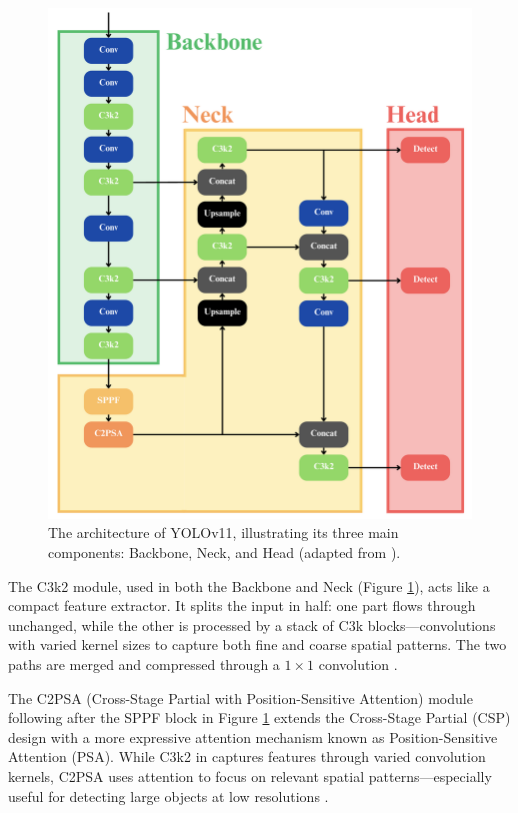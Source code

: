 \documentclass[a4paper,10pt,twocolumn]{article}
\numberwithin{figure}{section}
\numberwithin{table}{section}
\begin{document}
\begin{figure}[h]
    \centering
    \includegraphics[width=1\linewidth]{YOLOARC.png}  %
    \caption{The architecture of YOLOv11, illustrating its three main components: Backbone, Neck, and Head (adapted from \citep{hidayatullah2025yolov8yolo11comprehensivearchitecture}).}
    \label{fig:Arc}  
\end{figure}

The C3k2 module, used in both the Backbone and Neck (Figure \ref{fig:Arc}), 
acts like a compact feature extractor. It splits the input in half: 
one part flows through unchanged, while the other is processed by a stack 
of C3k blocks—convolutions with varied kernel sizes to capture both 
fine and coarse spatial patterns. The two paths are merged and 
compressed through a $1 \times 1$ convolution \citep{hidayatullah2025yolov8yolo11comprehensivearchitecture}.

The C2PSA (Cross-Stage Partial with Position-Sensitive Attention) module following after the SPPF block in Figure \ref{fig:Arc} extends the Cross-Stage Partial (CSP) design with a more expressive attention mechanism known as 
Position-Sensitive Attention (PSA).
While C3k2 in captures features through varied convolution kernels, 
C2PSA uses attention to focus on relevant spatial patterns—especially 
useful for detecting large objects at low resolutions \citep{ultralytics2025}.
\end{document}
